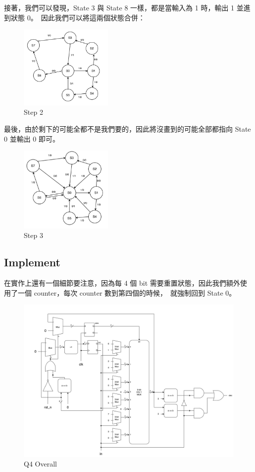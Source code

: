 \documentclass[10.5pt,compsoc,UTF8]{CjC}
\theoremstyle{mystyle}
\begin{document}
接著，我們可以發現，State 3 與 State 8 一樣，都是當輸入為 1 時，輸出 1 並進到狀態 0。\
因此我們可以將這兩個狀態合併：

\begin{figure}[h!]
  \centering
  \includegraphics[width=0.4\textwidth]{./img/Q4-SD2.png}
  \caption{Step 2}
  \label{fig:SD2}
\end{figure}

\newpage
最後，由於剩下的可能全都不是我們要的，因此將沒畫到的可能全部都指向 State 0 並輸出 0 即可。

\begin{figure}[h!]
  \centering
  \includegraphics[width=0.4\textwidth]{./img/Q4-SD3.png}
  \caption{Step 3}
  \label{fig:SD3}
\end{figure}

\newpage
\subsection{Implement}

在實作上還有一個細節要注意，因為每 4 個 bit 需要重置狀態，因此我們額外使用了一個 counter，每次 counter 數到第四個的時候，\
就強制回到 State 0。

\begin{figure}[h!]
  \centering
  \includegraphics[width=\textwidth]{./img/Q4.png}
  \caption{Q4 Overall}
  \label{fig:Q4-Overall}
\end{figure}
\end{document}
